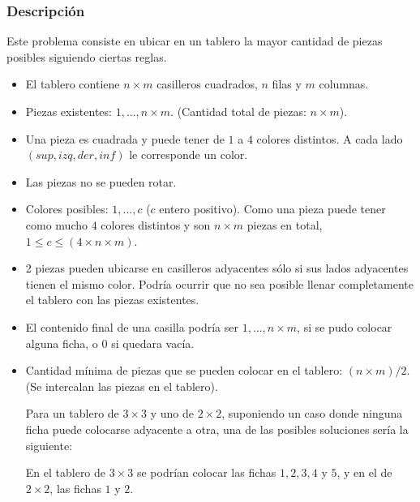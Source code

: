 \documentclass[11pt, a4paper, twoside]{article}
\begin{document}
{}

\subsubsection{Descripción}

Este problema consiste en ubicar en un tablero la mayor cantidad de piezas
posibles siguiendo ciertas reglas.

\begin{itemize}   
	\item El tablero contiene $n \times m$ casilleros cuadrados, $n$ filas y $m$
	columnas.

	\item Piezas existentes: $1,...,n \times m$. (Cantidad total de 
	piezas: $n \times m$).

	\item Una pieza es cuadrada y puede tener de $1$ a $4$ colores distintos. 
	A cada lado $(sup, izq, der, inf)$ le corresponde un color. 

	\item Las piezas no se pueden rotar.

	\item Colores posibles: $1,...,c$ ($c$ entero positivo). Como una pieza 
	puede tener como mucho $4$ colores distintos y son $n \times m$ 
	piezas en total, $ 1 \le c \le (4 \times n \times m)$.  

	\item 2 piezas pueden ubicarse en casilleros adyacentes sólo si sus lados 
	adyacentes tienen el mismo color. Podría ocurrir que no sea posible 
	llenar completamente el tablero con las piezas existentes. 

	\item El contenido final de una casilla podría ser $1,...,n \times m$, 
	si se pudo colocar alguna ficha, o $0$ si quedara vacía. 

	\item Cantidad mínima de piezas que se pueden colocar en el tablero: 
	$(n \times m)/ 2$. (Se intercalan las piezas en el tablero).

	Para un tablero de $3\times 3$ y uno de $2\times 2$, suponiendo un caso 
	donde ninguna ficha puede colocarse adyacente a otra, una de las posibles 
	soluciones sería la siguiente:

	En el tablero de $3\times 3$ se podrían colocar las fichas $1,2,3,4$ 
	y $5$, y en el de $2\times 2$, las fichas $1$ y $2$.


\end{itemize}
\end{document}
